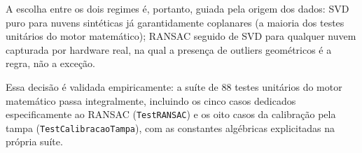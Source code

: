 \noindent A escolha entre os dois regimes é, portanto, guiada pela
origem dos dados: SVD puro para nuvens sintéticas já garantidamente
coplanares (a maioria dos testes unitários do motor matemático); RANSAC
seguido de SVD para qualquer nuvem capturada por hardware real, na qual
a presença de outliers geométricos é a regra, não a exceção.

\noindent Essa decisão é validada empiricamente: a suíte de 88 testes
unitários do motor matemático passa integralmente, incluindo os cinco
casos dedicados especificamente ao RANSAC (\texttt{TestRANSAC}) e os
oito casos da calibração pela tampa (\texttt{TestCalibracaoTampa}), com
as constantes algébricas explicitadas na própria suíte.
